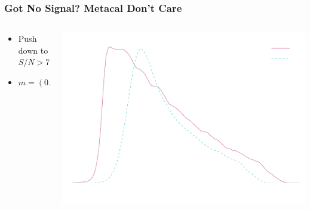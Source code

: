 \documentclass{beamer}
\newcommand{\snr}{$S/N$}
\begin{document}
\frame
{
    \frametitle{Got No Signal?  Metacal Don't Care}
 
 
    \begin{columns}
        \begin{column}{0.5\textwidth}
            \begin{itemize}
                \item Push down to  \snr$ > 7$
                \item {\color{gold}$m = (0.55 \pm 0.34) \times 10^{-3}$}
            \end{itemize}
        \end{column}
        \begin{column}{0.5\textwidth}
            \begin{center}
                \includegraphics[width=\columnwidth]{run-bdj03mcal01-s2n-inv.pdf}
                \newline
            \end{center}
        \end{column}
    \end{columns}


}
\end{document}
